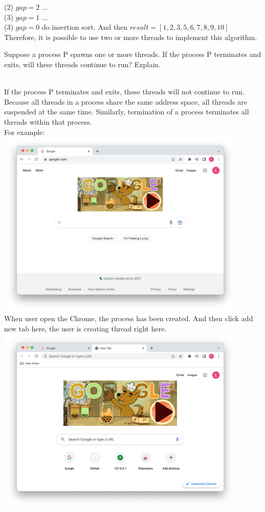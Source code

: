 \documentclass[12pt]{article}
\newenvironment{sol}[1][Solution]{\begin{trivlist}\item[\hskip\labelsep {\bfseries #1:}]}{\end{trivlist}}
\begin{document}
\begin{enumerate}
\begin{sol}
(2) $gap = 2$ ... \\
(3) $gap = 1$ ...\\
(3) $gap = 0$ do insertion sort. And then $result = [1, 2, 3, 5, 6, 7, 8, 9, 10]$ \\
Therefore, it is possible to use two or more threads to implement this algorithm.


\end{sol}

\newpage
\item Suppose a process P spawns one or more threads. If the process P terminates and exits, will these threads continue to run? Explain.
\begin{sol}
\hspace*{\fill} \\
If the process P terminates and exits, these threads will not continue to run. \\
Because all threads in a process share the same address space, all threads are suspended at the same time. Similarly, termination of a process terminates all threads within that process.\\
For example:\\
    \includegraphics[width=0.9\textwidth]{problem7.png}\\
    When user open the Chrome, the process has been created. And then click add new tab here, the user is creating thread right here. \\
    \includegraphics[width=0.9\textwidth]{problem7b.png}\\

\end{sol}
\end{enumerate}
\end{document}
